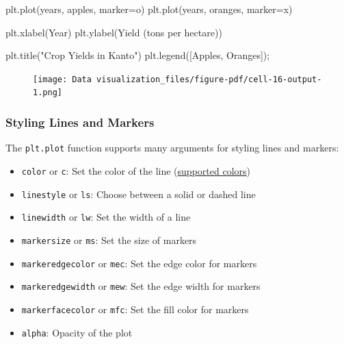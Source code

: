 \documentclass[
  letterpaper,
  DIV=11,
  numbers=noendperiod]{scrreprt}
\newenvironment{Shaded}{\begin{snugshade}}{\end{snugshade}}
\newcommand{\NormalTok}[1]{\textcolor[rgb]{0.00,0.23,0.31}{#1}}
\newcommand{\OperatorTok}[1]{\textcolor[rgb]{0.37,0.37,0.37}{#1}}
\newcommand{\StringTok}[1]{\textcolor[rgb]{0.13,0.47,0.30}{#1}}
\providecommand{\tightlist}{%
  \setlength{\itemsep}{0pt}\setlength{\parskip}{0pt}}\usepackage{longtable,booktabs,array}
\begin{document}
\begin{Shaded}
\begin{Highlighting}[]
\NormalTok{plt.plot(years, apples, marker}\OperatorTok{=}\StringTok{\textquotesingle{}o\textquotesingle{}}\NormalTok{)}
\NormalTok{plt.plot(years, oranges, marker}\OperatorTok{=}\StringTok{\textquotesingle{}x\textquotesingle{}}\NormalTok{)}

\NormalTok{plt.xlabel(}\StringTok{\textquotesingle{}Year\textquotesingle{}}\NormalTok{)}
\NormalTok{plt.ylabel(}\StringTok{\textquotesingle{}Yield (tons per hectare)\textquotesingle{}}\NormalTok{)}

\NormalTok{plt.title(}\StringTok{"Crop Yields in Kanto"}\NormalTok{)}
\NormalTok{plt.legend([}\StringTok{\textquotesingle{}Apples\textquotesingle{}}\NormalTok{, }\StringTok{\textquotesingle{}Oranges\textquotesingle{}}\NormalTok{])}\OperatorTok{;}
\end{Highlighting}
\end{Shaded}

\begin{figure}[H]

{\centering \texttt{[image: Data visualization\_files/figure-pdf/cell-16-output-1.png]}

}

\end{figure}

\hypertarget{styling-lines-and-markers}{%
\subsubsection{Styling Lines and
Markers}\label{styling-lines-and-markers}}

The \texttt{plt.plot} function supports many arguments for styling lines
and markers:

\begin{itemize}
\tightlist
\item
  \texttt{color} or \texttt{c}: Set the color of the line
  (\href{https://matplotlib.org/3.1.0/gallery/color/named_colors.html}{supported
  colors})
\item
  \texttt{linestyle} or \texttt{ls}: Choose between a solid or dashed
  line
\item
  \texttt{linewidth} or \texttt{lw}: Set the width of a line
\item
  \texttt{markersize} or \texttt{ms}: Set the size of markers
\item
  \texttt{markeredgecolor} or \texttt{mec}: Set the edge color for
  markers
\item
  \texttt{markeredgewidth} or \texttt{mew}: Set the edge width for
  markers
\item
  \texttt{markerfacecolor} or \texttt{mfc}: Set the fill color for
  markers
\item
  \texttt{alpha}: Opacity of the plot
\end{itemize}
\end{document}
